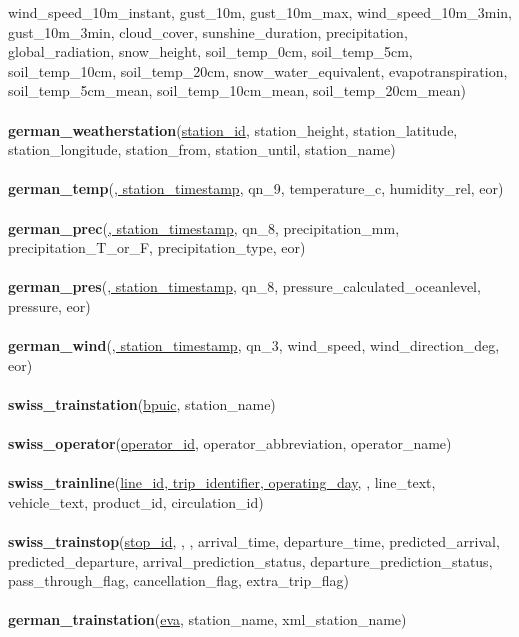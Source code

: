 wind\_speed\_10m\_instant, gust\_10m, gust\_10m\_max, wind\_speed\_10m\_3min, gust\_10m\_3min,
cloud\_cover, sunshine\_duration, precipitation, global\_radiation, snow\_height,
soil\_temp\_0cm, soil\_temp\_5cm, soil\_temp\_10cm, soil\_temp\_20cm, snow\_water\_equivalent,
evapotranspiration, soil\_temp\_5cm\_mean, soil\_temp\_10cm\_mean, soil\_temp\_20cm\_mean)\\\\
\textbf{german\_weatherstation}(\underline{station\_id}, station\_height, station\_latitude, station\_longitude, station\_from, station\_until, station\_name)\\\\
\textbf{german\_temp}(\underline{, station\_timestamp}, qn\_9, temperature\_c, humidity\_rel, eor)\\\\
\textbf{german\_prec}(\underline{, station\_timestamp}, qn\_8, precipitation\_mm, precipitation\_T\_or\_F, precipitation\_type, eor)\\\\
\textbf{german\_pres}(\underline{, station\_timestamp}, qn\_8, pressure\_calculated\_oceanlevel, pressure, eor)\\\\
\textbf{german\_wind}(\underline{, station\_timestamp}, qn\_3, wind\_speed, wind\_direction\_deg, eor)\\\\
\textbf{swiss\_trainstation}(\underline{bpuic}, station\_name)\\\\
\textbf{swiss\_operator}(\underline{operator\_id}, operator\_abbreviation, operator\_name)\\\\
\textbf{swiss\_trainline}(\underline{line\_id, trip\_identifier, operating\_day}, , line\_text, vehicle\_text, product\_id, circulation\_id)\\\\
\textbf{swiss\_trainstop}(\underline{stop\_id}, , , arrival\_time, departure\_time, predicted\_arrival, predicted\_departure, arrival\_prediction\_status, departure\_prediction\_status, pass\_through\_flag, cancellation\_flag, extra\_trip\_flag)\\\\
\textbf{german\_trainstation}(\underline{eva}, station\_name, xml\_station\_name)\\\\
